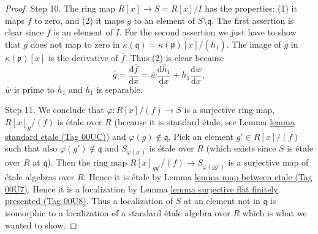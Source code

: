 \documentclass{amsart}
\theoremstyle{plain}
\theoremstyle{definition}
\theoremstyle{remark}
\numberwithin{equation}{subsection}
\begin{document}
\begin{proof}
\medskip\noindent
Step 10. The ring map $R[x] \to S = R[x]/I$ has the properties:
(1) it maps $f$ to zero, and
(2) it maps $g$ to an element of $S \setminus \mathfrak q$.
The first assertion is clear since $f$ is an element of $I$.
For the second assertion we just have to show that $g$ does
not map to zero in
$\kappa(\mathfrak q) = \kappa(\mathfrak p)[x]/(\overline{h}_1)$.
The image of $g$ in $\kappa(\mathfrak p)[x]$ is the derivative
of $\overline{f}$. Thus (2) is clear because
$$
\overline{g} =
\frac{\text{d}\overline{f}}{\text{d}x} =
\overline{w}\frac{\text{d}\overline{h}_1}{\text{d}x} +
\overline{h}_1\frac{\text{d}\overline{w}}{\text{d}x},
$$
$\overline{w}$ is prime to $\overline{h}_1$ and
$\overline{h}_1$ is separable.

\medskip\noindent
Step 11.
We conclude that $\varphi : R[x]/(f) \to S$ is a surjective ring map,
$R[x]_g/(f)$ is \'etale over $R$ (because it is standard \'etale,
see Lemma \href{https://stacks.math.columbia.edu/tag/00UC}{lemma standard etale (Tag 00UC)}) and $\varphi(g) \not \in \mathfrak q$.
Pick an element $g' \in R[x]/(f)$ such that
also $\varphi(g') \not \in \mathfrak q$ and $S_{\varphi(g')}$
is \'etale over $R$ (which exists since $S$ is \'etale over $R$ at
$\mathfrak q$). Then the ring map
$R[x]_{gg'}/(f) \to S_{\varphi(gg')}$ is a surjective map of \'etale
algebras over $R$. Hence it is \'etale by Lemma \href{https://stacks.math.columbia.edu/tag/00U7}{lemma map between etale (Tag 00U7)}.
Hence it is a localization by
Lemma \href{https://stacks.math.columbia.edu/tag/00U8}{lemma surjective flat finitely presented (Tag 00U8)}.
Thus a localization of $S$ at an element not in $\mathfrak q$ is
isomorphic to a localization of a standard \'etale algebra over $R$
which is what we wanted to show.
\end{proof}
\end{document}
